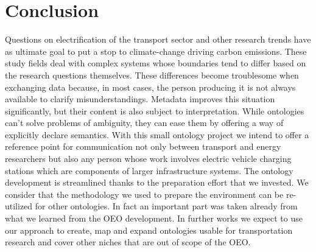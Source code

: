 ﻿\section{Conclusion}
\label{conclusion}

Questions on electrification of the transport sector and other research trends
have as ultimate goal to put a stop to climate-change driving carbon emissions.
These study fields deal with complex systems whose boundaries tend to differ
based on the research questions themselves. These differences become troublesome
when exchanging data because, in most cases, the person producing it is not
always available to clarify misunderstandings. Metadata improves this situation
significantly, but their content is also subject to interpretation. While
ontologies can't solve problems of ambiguity, they can ease them by offering a
way of explicitly declare semantics. With this small ontology project we intend
to offer a reference point for communication not only between transport and
energy researchers but also any person whose work involves electric vehicle
charging stations which are components of larger infrastructure systems. The
ontology development is streamlined thanks to the preparation effort that we
invested. We consider that the methodology we used to prepare the environment
can be re-utilized for other ontologies. In fact an important part was taken
already from what we learned from the OEO development. In further works we
expect to use our approach to create, map and expand ontologies usable for
transportation research and cover other niches that are out of scope of the OEO.